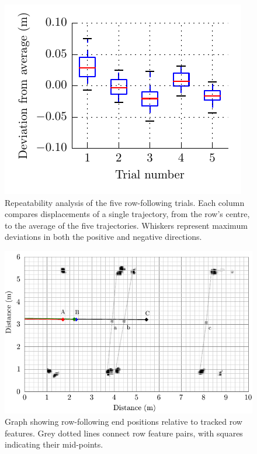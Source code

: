 \documentclass[preprint,authoryear,12pt]{elsarticle}
\begin{document}
    \begin{figure}[htb]
        \centering
        \includegraphics{images/row_tracking_repeatability.pdf}
        \caption{
        Repeatability analysis of the five row-following trials.
        Each column compares displacements of a single trajectory, from the row's centre, to the average of the five trajectories.
        Whiskers represent maximum deviations in both the positive and negative directions.
        }
        \label{fig:row_following_repeatability}
    \end{figure}


    \begin{figure}[htb]
        \centering
        \includegraphics{images/paths_end_points.pdf}
        \caption{
            Graph showing row-following end positions relative to tracked row features.
            Grey dotted lines connect row feature pairs, with squares indicating their mid-points.
        }
        \label{fig:row_following_end_points}
    \end{figure}
\end{document}
